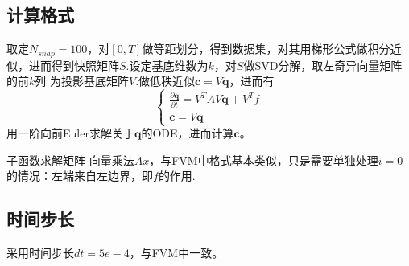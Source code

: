 \documentclass[11pt,a4 paper,one side]{article}
\begin{document}
\subsection{计算格式}
取定$N_{snap} = 100$，对$[0,T]$做等距划分，得到数据集，对其用梯形公式做积分近似，进而得到快照矩阵$S$.设定基底维数为$k$，对$S$做SVD分解，取左奇异向量矩阵的前$k$列
为投影基底矩阵$V$.做低秩近似$\mathbf{c} = V\mathbf{q}$，进而有\begin{equation}
    \begin{cases}
        \frac{\partial \mathbf{q}}{\partial t} = V^{T}AV\mathbf{q}+V^{T}f
        \\
        \mathbf{c} = V\mathbf{q}
    \end{cases}
\end{equation}
用一阶向前Euler求解关于$\mathbf{q}$的ODE，进而计算$\mathbf{c}$。
\par 子函数求解矩阵-向量乘法$Ax$，与FVM中格式基本类似，只是需要单独处理$i=0$的情况：左端来自左边界，即$f$的作用.
\subsection{时间步长}
采用时间步长$dt = 5e-4$，与FVM中一致。
\end{document}
